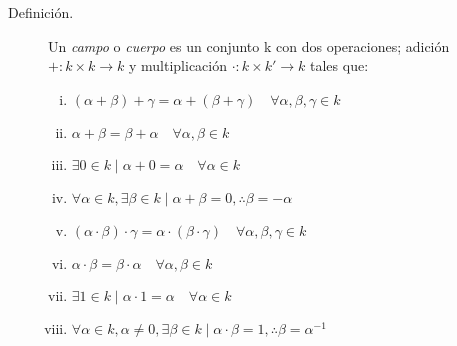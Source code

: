 \documentclass[12pt]{article}
\begin{document}
\begin{description}
\item [Definición.] Un \emph{campo} o \emph{cuerpo} es un conjunto k con dos operaciones; adición $+: k \times k \to k$ y multiplicación $\cdot: k \times k' \to k$ tales que:

\begin{enumerate}[i)]

\item
\begin{math}
	(\alpha + \beta) + \gamma = \alpha + (\beta + \gamma) \quad \forall \alpha, \beta, \gamma \in k
\end{math}

\item
\begin{math}
	\alpha + \beta = \beta + \alpha \quad \forall \alpha, \beta \in k
\end{math}

\item
\begin{math}
	\exists 0 \in k \mid \alpha + 0 = \alpha \quad \forall \alpha \in k
\end{math}

\item
\begin{math}
	\forall \alpha \in k, \exists \beta \in k \mid \alpha + \beta = 0, \therefore \beta = - \alpha
\end{math}

\item
\begin{math}
	(\alpha \cdot \beta) \cdot \gamma = \alpha \cdot (\beta \cdot \gamma) \quad \forall \alpha, \beta, \gamma \in k
\end{math}

\item
\begin{math}
	\alpha \cdot \beta = \beta \cdot \alpha \quad \forall \alpha, \beta \in k
\end{math}

\item
\begin{math}
	\exists 1 \in k \mid \alpha \cdot 1 = \alpha \quad \forall \alpha \in k
\end{math}

\item
\begin{math}
	\forall \alpha \in k, \alpha \ne 0, \exists \beta \in k \mid \alpha \cdot \beta = 1, \therefore \beta = \alpha^{-1}
\end{math}


\end{enumerate}
\end{description}
\end{document}
